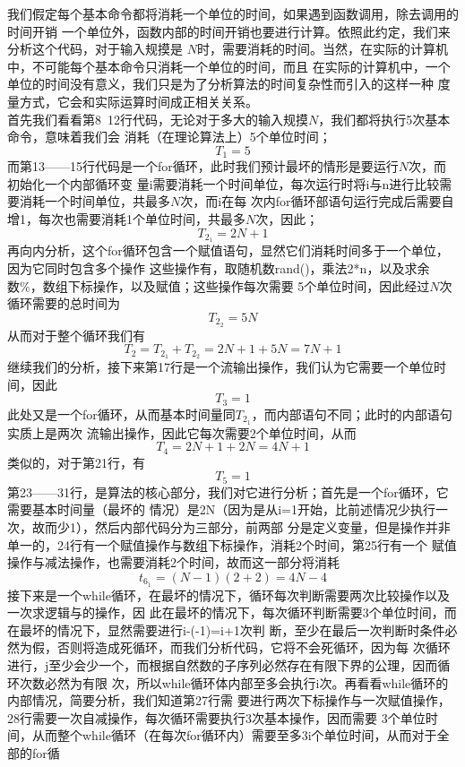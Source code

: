 \documentclass[a4paper,12pt]{ctexart}
\begin{document}
		\indent
		我们假定每个基本命令都将消耗一个单位的时间，如果遇到函数调用，除去调用的时间开销
		一个单位外，函数内部的时间开销也要进行计算。依照此约定，我们来分析这个代码，对于输入规摸是
		$N$时，需要消耗的时间。当然，在实际的计算机中，不可能每个基本命令只消耗一个单位的时间，而且
		在实际的计算机中，一个单位的时间没有意义，我们只是为了分析算法的时间复杂性而引入的这样一种
		度量方式，它会和实际运算时间成正相关关系。\\
		\indent
		首先我们看看第8~12行代码，无论对于多大的输入规摸$N$，我们都将执行5次基本命令，意味着我们会
		消耗（在理论算法上）5个单位时间；
		$$
		T_1 = 5
		$$
		而第13——15行代码是一个for循环，此时我们预计最坏的情形是要运行$N$次，而初始化一个内部循环变
		量i需要消耗一个时间单位，每次运行时将i与n进行比较需要消耗一个时间单位，共最多$N$次，而i在每
		次内for循环部语句运行完成后需要自增1，每次也需要消耗1个单位时间，共最多$N$次，因此；
		$$
		T_{2_1}=2N+1
		$$
		再向内分析，这个for循环包含一个赋值语句，显然它们消耗时间多于一个单位，因为它同时包含多个操作
		这些操作有，取随机数rand()，乘法2*n，以及求余数\%，数组下标操作，以及赋值；这些操作每次需要
		5个单位时间，因此经过$N$次循环需要的总时间为
		$$
		T_{2_2}=5N
		$$
		从而对于整个循环我们有
		$$
		T_2 = T_{2_1}+T_{2_2} = 2N+1+5N=7N+1
		$$
		继续我们的分析，接下来第17行是一个流输出操作，我们认为它需要一个单位时间，因此
		$$
		T_3 = 1
		$$
		此处又是一个for循环，从而基本时间量同$T_{2_1}$，而内部语句不同；此时的内部语句实质上是两次
		流输出操作，因此它每次需要2个单位时间，从而
		$$
		T_4 = 2N+1+2N = 4N+1
		$$
		类似的，对于第21行，有
		$$
		T_5 = 1
		$$
		第23——31行，是算法的核心部分，我们对它进行分析；首先是一个for循环，它需要基本时间量（最坏的
		情况）是2N（因为是从i=1开始，比前述情况少执行一次，故而少1），然后内部代码分为三部分，前两部
		分是定义变量，但是操作并非单一的，24行有一个赋值操作与数组下标操作，消耗2个时间，第25行有一个
		赋值操作与减法操作，也需要消耗2个时间，故而这一部分将消耗
		$$
		t_{6_1} = (N-1)(2+2) = 4N-4
		$$
		接下来是一个while循环，在最坏的情况下，循环每次判断需要两次比较操作以及一次求逻辑与的操作，因
		此在最坏的情况下，每次循环判断需要3个单位时间，而在最坏的情况下，显然需要进行i-(-1)=i+1次判
		断，至少在最后一次判断时条件必然为假，否则将造成死循环，而我们分析代码，它将不会死循环，因为每
		次循环进行，j至少会少一个，而根据自然数的子序列必然存在有限下界的公理，因而循环次数必然为有限
		次，所以while循环体内部至多会执行i次。再看看while循环的内部情况，简要分析，我们知道第27行需
		要进行两次下标操作与一次赋值操作，28行需要一次自减操作，每次循环需要执行3次基本操作，因而需要
		3个单位时间，从而整个while循环（在每次for循环内）需要至多3i个单位时间，从而对于全部的for循
\end{document}
